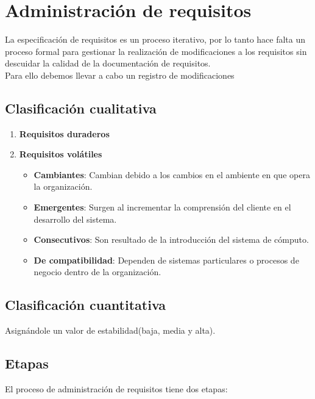 \section{Administración de requisitos}
La especificación de requisitos es un proceso iterativo, por lo tanto hace falta un proceso formal para gestionar la realización de modificaciones a los requisitos sin descuidar la calidad de la documentación de requisitos.\\
Para ello debemos llevar a cabo un registro de modificaciones

\subsection{Clasificación cualitativa}
\begin{enumerate}
    \item \textbf{Requisitos duraderos}
    \item \textbf{Requisitos volátiles}
          \begin{itemize}
              \item \textbf{Cambiantes}: Cambian debido a los cambios en el ambiente en que opera la organización.
              \item \textbf{Emergentes}: Surgen al incrementar la comprensión del cliente en el desarrollo del sistema.
              \item \textbf{Consecutivos}: Son resultado de la introducción del sistema de cómputo. %
              \item \textbf{De compatibilidad}: Dependen de sistemas particulares o procesos de negocio dentro de la organización.
          \end{itemize}
\end{enumerate}
\subsection{Clasificación cuantitativa}
Asignándole un valor de estabilidad(baja, media y alta).

\subsection{Etapas}
El proceso de administración de requisitos tiene dos etapas:

